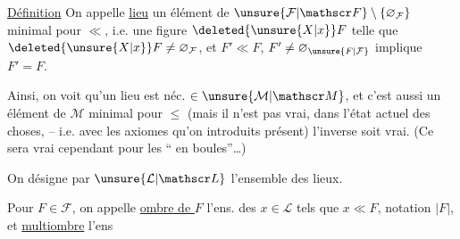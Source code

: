 


\noindent\llap{\smash{\rule[-2.1\baselineskip]{.35pt}{2.8\baselineskip}}\hspace{.6em}}\uline{Définition} On appelle \uline{lieu}  un élément de $\unsure{\mathcal F|\mathscr F}\setminus\{\varnothing_{\mathcal F}\}$ minimal pour $\ll$, i.e. une figure $\deleted{\unsure{X|x}}F$ telle que $\deleted{\unsure{X|x}}F\neq\varnothing_{\mathcal F}$, et $F'\ll F$, $F'\neq\varnothing_{\unsure{F|\mathcal F}}$ implique $F'=F$.

Ainsi, on voit qu'un lieu est néc. $\in\unsure{\mathcal M|\mathscr M}$, et c'est aussi un élément de $\mathcal M$ minimal pour $\leq$ (mais il n'est pas vrai, dans l'état actuel des choses, -- i.e. avec les axiomes qu'on  introduits  présent) l'inverse soit vrai. (Ce sera vrai cependant pour les `` en boules''\ldots)

On désigne par $\unsure{\mathcal L|\mathscr L}$ l'ensemble des lieux.

 Pour  $F\in\mathcal F$, on appelle \uline{ombre de $F$} l'ens. des $x\in\mathcal L$ tels que $x\ll F$, notation $\lvert F\rvert$, et \uline{multiombre} l'ens
